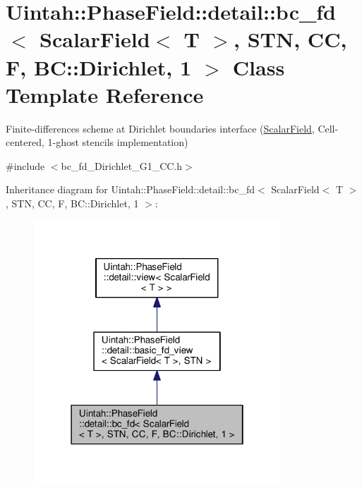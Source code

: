 \hypertarget{classUintah_1_1PhaseField_1_1detail_1_1bc__fd_3_01ScalarField_3_01T_01_4_00_01STN_00_01CC_00_01Fa77b2fd7fb77d0a4dc6c86c68d4ea0bc}{}\section{Uintah\+:\+:Phase\+Field\+:\+:detail\+:\+:bc\+\_\+fd$<$ Scalar\+Field$<$ T $>$, S\+TN, CC, F, BC\+:\+:Dirichlet, 1 $>$ Class Template Reference}
\label{classUintah_1_1PhaseField_1_1detail_1_1bc__fd_3_01ScalarField_3_01T_01_4_00_01STN_00_01CC_00_01Fa77b2fd7fb77d0a4dc6c86c68d4ea0bc}


Finite-\/differences scheme at Dirichlet boundaries interface (\hyperlink{structUintah_1_1PhaseField_1_1ScalarField}{Scalar\+Field}, Cell-\/centered, 1-\/ghost stencils implementation)  




{\ttfamily \#include $<$bc\+\_\+fd\+\_\+\+Dirichlet\+\_\+\+G1\+\_\+\+C\+C.\+h$>$}



Inheritance diagram for Uintah\+:\+:Phase\+Field\+:\+:detail\+:\+:bc\+\_\+fd$<$ Scalar\+Field$<$ T $>$, S\+TN, CC, F, BC\+:\+:Dirichlet, 1 $>$\+:\nopagebreak
\begin{figure}[H]
\begin{center}
\leavevmode
\includegraphics[width=262pt]{classUintah_1_1PhaseField_1_1detail_1_1bc__fd_3_01ScalarField_3_01T_01_4_00_01STN_00_01CC_00_01F69c852c1346d1beda70b87f87de8e083}
\end{center}
\end{figure}


